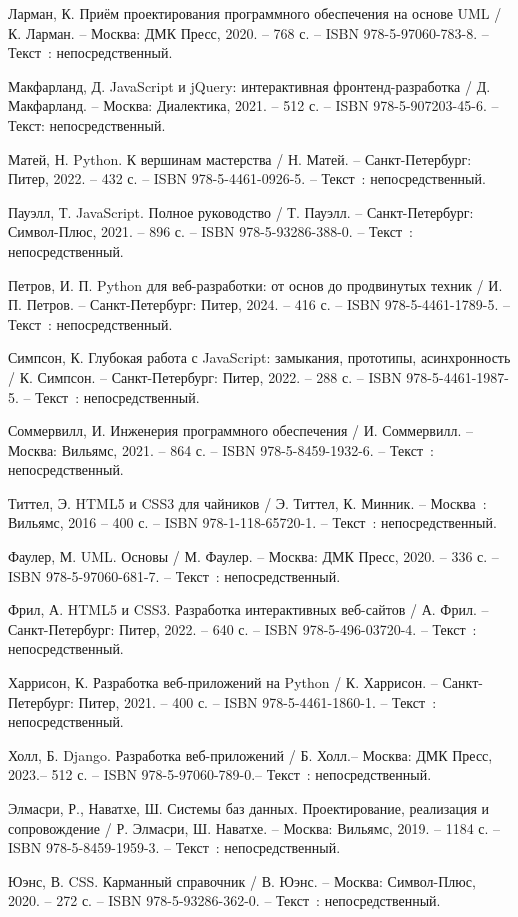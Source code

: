 \begin{thebibliography}{9}
     Ларман, К. Приём проектирования программного обеспечения на основе UML / К. Ларман. – Москва: ДМК Пресс, 2020. – 768 с. – ISBN 978-5-97060-783-8. – Текст~: непосредственный.
    
     Макфарланд, Д. JavaScript и jQuery: интерактивная фронтенд-разработка / Д. Макфарланд. – Москва: Диалектика, 2021. – 512 с. – ISBN 978-5-907203-45-6. – Текст: непосредственный.  

     Матей, Н. Python. К вершинам мастерства / Н. Матей. – Санкт-Петербург: Питер, 2022. – 432 с. – ISBN 978-5-4461-0926-5. – Текст~: непосредственный.
    
     Пауэлл, Т. JavaScript. Полное руководство / Т. Пауэлл. – Санкт-Петербург: Символ-Плюс, 2021. – 896 с. – ISBN 978-5-93286-388-0. – Текст~: непосредственный.
	
	 Петров, И. П. Python для веб-разработки: от основ до продвинутых техник / И. П. Петров. – Санкт-Петербург: Питер, 2024. – 416 с. – ISBN 978-5-4461-1789-5. – Текст~: непосредственный.
	
     Симпсон, К. Глубокая работа с JavaScript: замыкания, прототипы, асинхронность / К. Симпсон. – Санкт-Петербург: Питер, 2022. – 288 с. – ISBN 978-5-4461-1987-5. – Текст~: непосредственный.  
    
     Соммервилл, И. Инженерия программного обеспечения / И. Соммервилл. – Москва: Вильямс, 2021. – 864 с. – ISBN 978-5-8459-1932-6. – Текст~: непосредственный.
	
		Титтел, Э. HTML5 и CSS3 для чайников / Э. Титтел, К. Минник. – Москва~: Вильямс, 2016 – 400 с. – ISBN 978-1-118-65720-1. – Текст~: непосредственный.
	
	 Фаулер, М. UML. Основы / М. Фаулер. – Москва: ДМК Пресс, 2020. – 336 с. – ISBN 978-5-97060-681-7. – Текст~: непосредственный.
	
	 Фрил, А. HTML5 и CSS3. Разработка интерактивных веб-сайтов / А. Фрил. – Санкт-Петербург: Питер, 2022. – 640 с. – ISBN 978-5-496-03720-4. – Текст~: непосредственный.
	
	 Харрисон, К. Разработка веб-приложений на Python / К. Харрисон. – Санкт-Петербург: Питер, 2021. – 400 с. – ISBN 978-5-4461-1860-1. – Текст~: непосредственный.
	
		Холл, Б. Django. Разработка веб-приложений / Б. Холл.– Москва: ДМК Пресс, 2023.– 512 с. – ISBN 978-5-97060-789-0.– Текст~: непосредственный.
	
	 Элмасри, Р., Наватхе, Ш. Системы баз данных. Проектирование, реализация и сопровождение / Р. Элмасри, Ш. Наватхе. – Москва: Вильямс, 2019. – 1184 с. – ISBN 978-5-8459-1959-3. – Текст~: непосредственный.
	
     Юэнс, В. CSS. Карманный справочник / В. Юэнс. – Москва: Символ-Плюс, 2020. – 272 с. – ISBN 978-5-93286-362-0. – Текст~: непосредственный.


\end{thebibliography}
